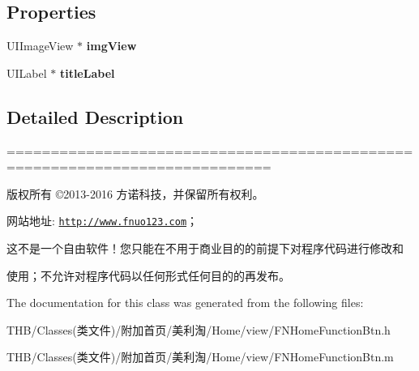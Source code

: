\subsection*{Properties}
\begin{DoxyCompactItemize}
\item 
\mbox{\label{interface_f_n_home_function_btn_aace9b289c0a079fdbf486ca0fc74e8b9}} 
U\+I\+Image\+View $\ast$ {\bfseries img\+View}
\item 
\mbox{\label{interface_f_n_home_function_btn_a48c8cd6c53941ad634a45dc8da233f37}} 
U\+I\+Label $\ast$ {\bfseries title\+Label}
\end{DoxyCompactItemize}


\subsection{Detailed Description}
============================================================================

版权所有 ©2013-\/2016 方诺科技，并保留所有权利。

网站地址\+: \href{http://www.fnuo123.com}{\tt http\+://www.\+fnuo123.\+com}； 



这不是一个自由软件！您只能在不用于商业目的的前提下对程序代码进行修改和

使用；不允许对程序代码以任何形式任何目的的再发布。 

 

The documentation for this class was generated from the following files\+:\begin{DoxyCompactItemize}
\item 
T\+H\+B/\+Classes(类文件)/附加首页/美利淘/\+Home/view/F\+N\+Home\+Function\+Btn.\+h\item 
T\+H\+B/\+Classes(类文件)/附加首页/美利淘/\+Home/view/F\+N\+Home\+Function\+Btn.\+m\end{DoxyCompactItemize}
